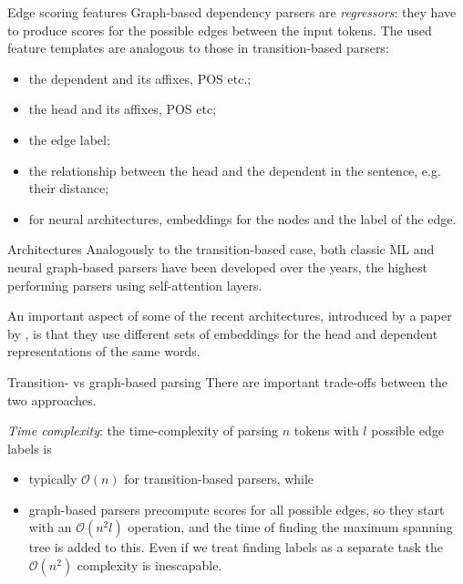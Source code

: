 \documentclass[style=upen, size=14pt]{powerdot}
\newcommand{\gold}{\color{arany}}
\theoremstyle{definition}
\begin{document}
\begin{slide}[toc=Edge features]{Edge scoring features}
  Graph-based dependency parsers are \emph{regressors}: they have to produce
  scores for the possible edges between the input tokens. The used feature
  templates are analogous to those in transition-based parsers:
  \begin{itemize}
  \item the dependent and its affixes, POS etc.;
  \item the head and its affixes, POS etc;
  \item the edge label;
  \item the relationship between the head and the dependent in the sentence,
    e.g. their distance;
  \item for neural architectures, embeddings for the nodes and the label of the
    edge.
  \end{itemize}
\end{slide}

\begin{slide}{Architectures}
  Analogously to the transition-based case, both classic ML and neural
  graph-based parsers have been developed over the years, the highest performing
  parsers using self-attention layers.\bigskip

  An important aspect of some of the recent architectures, introduced by a paper
  by \cite{dozat2016deep}, is that they use different sets of embeddings for the
  head and dependent representations of the same words.
\end{slide}


\begin{slide}[toc=Trade-offs]{Transition- vs graph-based parsing}
There are important trade-offs between the two approaches.\bigskip

\emph{\gold Time complexity}: the time-complexity of parsing $n$ tokens with $l$
possible edge labels is

\begin{itemize}
\item typically $\mathcal O (n)$ for transition-based parsers, while
\item graph-based parsers precompute scores for all possible edges, so they
  start with an $\mathcal O(n^2 l)$ operation, and the time of finding the
  maximum spanning tree is added to this. Even if we treat finding labels as a
  separate task the $\mathcal O(n^2)$ complexity is inescapable.
\end{itemize}
\end{slide}
\end{document}
